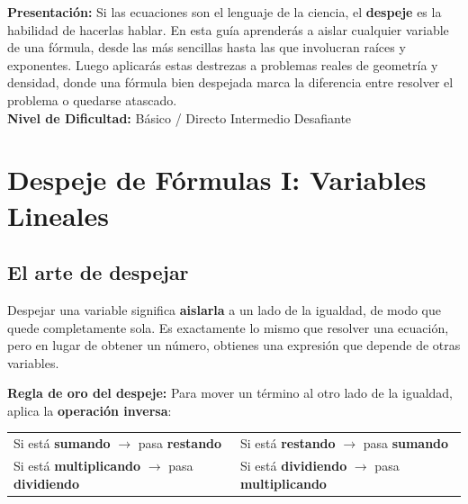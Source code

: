 \documentclass[12pt, letterpaper]{article}
\begin{document}


\vspace{4pt}
\begin{cuadroinfo}
  \small
  \textbf{Presentación:} Si las ecuaciones son el lenguaje de la ciencia, el \textbf{despeje} es la habilidad de hacerlas hablar. En esta guía aprenderás a aislar cualquier variable de una fórmula, desde las más sencillas hasta las que involucran raíces y exponentes. Luego aplicarás estas destrezas a problemas reales de geometría y densidad, donde una fórmula bien despejada marca la diferencia entre resolver el problema o quedarse atascado.
  \\[4pt]
  \textbf{Nivel de Dificultad:}\quad
  \facil{} Básico / Directo \quad
  \medio{} Intermedio \quad
  \dificil{} Desafiante
\end{cuadroinfo}

\vspace{8pt}

\section{Despeje de Fórmulas I: Variables Lineales}

\subsection{El arte de despejar}

Despejar una variable significa \textbf{aislarla} a un lado de la igualdad, de modo que quede completamente sola. Es exactamente lo mismo que resolver una ecuación, pero en lugar de obtener un número, obtienes una expresión que depende de otras variables.

\begin{cuadroteoria}
  \textbf{Regla de oro del despeje:} Para mover un término al otro lado de la igualdad, aplica la \textbf{operación inversa}:
  \begin{center}
    \begin{tabular}{ll}
      Si está \textbf{sumando} $\longrightarrow$ pasa \textbf{restando}         & Si está \textbf{restando} $\longrightarrow$ pasa \textbf{sumando}         \\
      Si está \textbf{multiplicando} $\longrightarrow$ pasa \textbf{dividiendo} & Si está \textbf{dividiendo} $\longrightarrow$ pasa \textbf{multiplicando}
    \end{tabular}
  \end{center}
\end{cuadroteoria}
\end{document}
